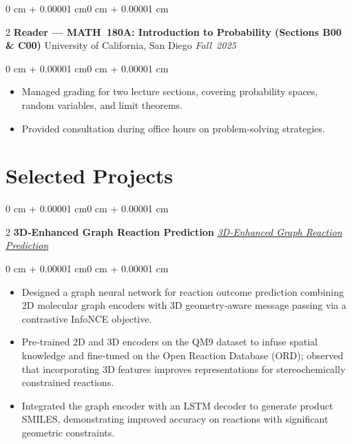\documentclass[10pt, letterpaper]{article}
\newenvironment{highlights}{\begin{itemize}[topsep=0.10 cm, parsep=0.10 cm, partopsep=0pt, itemsep=0pt, leftmargin=0 cm + 10pt]}{\end{itemize}}
\newenvironment{onecolentry}{\begin{adjustwidth}{0 cm + 0.00001 cm}{0 cm + 0.00001 cm}}{\end{adjustwidth}}
\newenvironment{twocolentry}[2][]{\onecolentry \def\secondColumn{#2} \setcolumnwidth{\fill, 4.5 cm} \begin{paracol}{2}}{\switchcolumn \raggedleft \secondColumn \end{paracol} \endonecolentry}
\let\hrefWithoutArrow\href
\renewcommand{\href}[2]{\hrefWithoutArrow{#1}{#2}}
\begin{document}
    \vspace{0.15 cm}

    \begin{twocolentry}{\textit{Fall 2025}}
        \textbf{Reader — MATH 180A: Introduction to Probability (Sections B00 \& C00)}\newline
        University of California, San Diego
    \end{twocolentry}

    \vspace{0.10 cm}
    \begin{onecolentry}
        \begin{highlights}
            \item Managed grading for two lecture sections, covering probability spaces, random variables, and limit theorems.
            \item Provided consultation during office hours on problem‑solving strategies.
        \end{highlights}
    \end{onecolentry}

    \section{Selected Projects}

    \begin{twocolentry}{\textit{\href{https://aaronzhfeng.github.io/projects/3d-enhanced-graph-reaction}{3D‑Enhanced Graph Reaction Prediction}}}
        \textbf{3D‑Enhanced Graph Reaction Prediction}
    \end{twocolentry}

    \vspace{0.10 cm}
    \begin{onecolentry}
        \begin{highlights}
            \item Designed a graph neural network for reaction outcome prediction combining 2D molecular graph encoders with 3D geometry‑aware message passing via a contrastive InfoNCE objective.
            \item Pre‑trained 2D and 3D encoders on the QM9 dataset to infuse spatial knowledge and fine‑tuned on the Open Reaction Database (ORD); observed that incorporating 3D features improves representations for stereochemically constrained reactions.
            \item Integrated the graph encoder with an LSTM decoder to generate product SMILES, demonstrating improved accuracy on reactions with significant geometric constraints.
        \end{highlights}
    \end{onecolentry}
\end{document}
